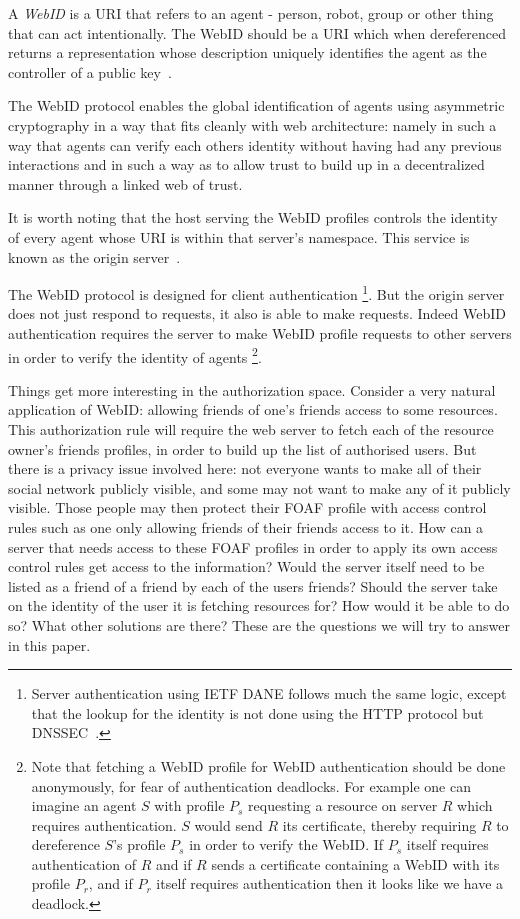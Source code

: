 \documentclass[a4paper]{llncs}
\begin{document}
A \textit{WebID} is a URI that refers to an agent - person, robot, group or other thing that can act intentionally.
The WebID should be a URI which when dereferenced returns a representation whose description uniquely identifies the agent as the controller of a public key~\cite{sporny-m-2011--a,story-h-2009--a}.

The WebID protocol enables the global identification of agents using asymmetric cryptography in a way that fits cleanly with web architecture:
namely in such a way that agents can verify each others identity without having had any previous interactions and in such a way as to allow trust to build up in a decentralized manner through a linked web of trust.

It is worth noting that the host serving the WebID profiles controls the identity of every agent whose URI is within that server's namespace.
This service is known as the origin server~\cite{barth-a-2011--a}.

The WebID protocol is designed for client authentication%
\footnote{Server authentication using IETF DANE follows much the same logic, except that the lookup for the identity is not done using the HTTP protocol but DNSSEC~\cite{hoffman-p-2012--a}.}.
But the origin server does not just respond to requests, it also is able to make requests.
Indeed WebID authentication requires the server to make WebID profile requests to other servers in order to verify the identity of agents%
\footnote{Note that fetching a WebID profile for WebID authentication should be done anonymously, for fear of authentication deadlocks. 
For example one can imagine an agent $S$ with profile $P_s$ requesting a resource on server $R$ which requires authentication.
$S$ would send $R$ its certificate, thereby requiring $R$ to dereference $S$'s profile $P_s$ in order to verify the WebID.
If $P_s$ itself requires authentication of $R$ and if $R$ sends a certificate containing a WebID with its profile $P_r$, and if $P_r$ itself requires authentication then it looks like we have a deadlock.}.

Things get more interesting in the authorization space.
Consider a very natural application of WebID: allowing friends of one's friends access to some resources.
This authorization rule will require the web server to fetch each of the resource owner's friends profiles, in order to build up the list of authorised users.
But there is a privacy issue involved here: not everyone wants to make all of their social network publicly visible, and some may not want to make any of it publicly visible.
Those people may then protect their FOAF profile with access control rules such as one only allowing friends of their friends access to it.
How can a server that needs access to these FOAF profiles in order to apply its own access control rules get access to the information? 
Would the server itself need to be listed as a friend of a friend by each of the users friends?
Should the server take on the identity of the user it is fetching resources for? 
How would it be able to do so?
What other solutions are there?
These are the questions we will try to answer in this paper.
\end{document}
